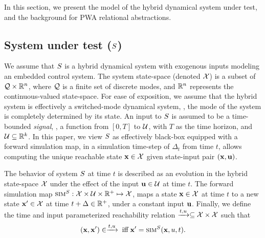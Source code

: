 In this section, we present the model of the hybrid dynamical system
under test, and the background for PWA relational abstractions.


\subsection{System under test ($S$)}

We assume that $S$ is a hybrid dynamical system with exogenous
inputs modeling an embedded control system. The system state-space
(denoted $\mathcal{X}$) is a subset of $\mathcal{Q} \times \mathbb{R}^n$,
where $\mathcal{Q}$ is a finite set of discrete modes, and $\mathbb{R}^n$
represents the continuous-valued state-space. For ease of exposition,
we assume that the hybrid system is effectively a switched-mode
dynamical system, \ie, the mode of the system is completely determined
by its state.  An input to $S$ is assumed to be a time-bounded
{\em signal}, \ie, a function from $[0,T]$ to $\mathcal{U}$, with $T$ as
the time horizon, and $\mathcal{U} \subseteq \mathbb{R}^k$.  In this paper, we
view $S$ as effectively black-box equipped with a forward
simulation map, in a simulation time-step of $\Delta_t$ from time $t$,
allows computing the unique reachable state $\mathbf{x} \in \mathcal{X}$
given state-input pair $(\mathbf{x},\mathbf{u})$.





\begin{definition}
    The behavior of system $S$ at time $t$ is described as an
    evolution in the hybrid state-space $\mathcal{X}$ under the
    effect of the input $\mathbf{u} \in \mathcal{U}$ at time $t$. The forward
    simulation map $\mbox{\sc sim}^{S} : \mathcal{X} \times \mathcal{U}
    \times \mathbb{R}^+ \mapsto \mathcal{X}$, maps a state $\mathbf{x}\in\mathcal{X}$ at time
    $t$ to a new state $\mathbf{x}'\in\mathcal{X}$ at time $t+\Delta\in\mathbb{R}^+$, under a constant
    input $\mathbf{u}$.  Finally, we define the time and input parameterized
    reachability relation $\xrightarrow{t,u} \subseteq \mathcal{X} \times
    \mathcal{X}$ such that
    \begin{equation}
        (\mathbf{x},\mathbf{x}') \in \xrightarrow{t,u} \;\text{iff}\; \mathbf{x}'=\mbox{\sc sim}^{S}(\mathbf{x},u,t).
    \end{equation}
\end{definition}

